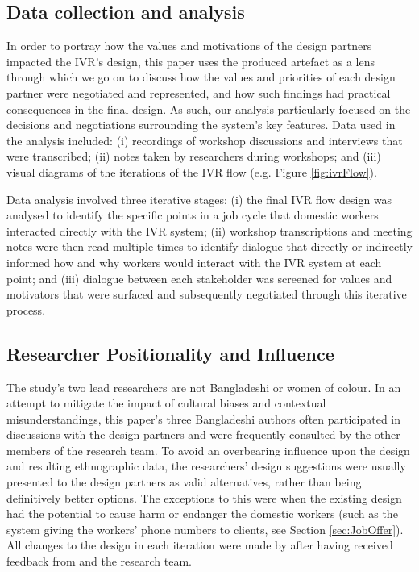 \subsection{Data collection and analysis}

In order to portray how the values and motivations of the design partners impacted the IVR's design, this paper uses the produced artefact as a lens through which we go on to discuss how the values and priorities of each design partner were negotiated and represented, and how such findings had practical consequences in the final design. As such, our analysis particularly focused on the decisions and negotiations surrounding the system's key features. Data used in the analysis included: (i) recordings of workshop discussions and interviews that were transcribed; (ii) notes taken by researchers during workshops; and (iii) visual diagrams of the iterations of the IVR flow (e.g. Figure \ref{fig:ivrFlow}). 

Data analysis involved three iterative stages: (i) the final IVR flow design was analysed to identify the specific points in a job cycle that domestic workers interacted directly with the IVR system; (ii) workshop transcriptions and meeting notes were then read multiple times to identify dialogue that directly or indirectly informed how and why workers would interact with the IVR system at each point; and (iii) dialogue between each stakeholder was screened for values and motivators that were surfaced and subsequently negotiated through this iterative process. 

\subsection{Researcher Positionality and Influence}

The study's two lead researchers are not Bangladeshi or women of colour. In an attempt to mitigate the impact of cultural biases and contextual misunderstandings, this paper's three Bangladeshi authors often participated in discussions with the design partners and were frequently consulted by the other members of the research team. To avoid an overbearing influence upon the design and resulting ethnographic data, the researchers' design suggestions were usually presented to the design partners as valid alternatives, rather than being definitively better options. The exceptions to this were when the existing design had the potential to cause harm or endanger the domestic workers (such as the system giving the workers' phone numbers to clients, see Section \ref{sec:JobOffer}). All changes to the design in each iteration were made by \PC{} after having received feedback from \NGO{} and the research team.